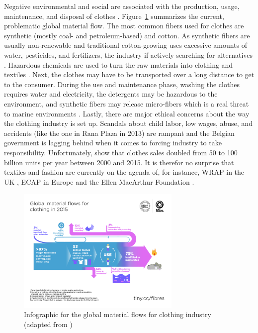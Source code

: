 \documentclass[review]{elsarticle}
\begin{document}
Negative environmental and social are associated with the production, usage, maintenance, and disposal of clothes \citep{Roos2016}. Figure~\ref{fig:MaterialFlow} summarizes the current, problematic global material flow. The most common fibers used for clothes are synthetic (mostly coal- and petroleum-based) and cotton. As synthetic fibers are usually non-renewable and traditional cotton-growing uses excessive amounts of water, pesticides, and fertilizers, the industry if actively searching for alternatives \citep{Meyer}. Hazardous chemicals are used to turn the raw materials into clothing and textiles \citep{VanDerVelden,Kant2012}. Next, the clothes may have to be transported over a long distance to get to the consumer. During the use and maintenance phase, washing the clothes requires water and electricity, the detergents may be hazardous to the environment, and synthetic fibers may release micro-fibers which is a real threat to marine environments \citep{Cesa2017,DeFalco2018, Thevenon}. Lastly, there are major ethical concerns about the way the clothing industry is set up. Scandals about child labor, low wages, abuse, and accidents (like the one in Rana Plaza in 2013) are rampant and the Belgian government is lagging behind when it comes to forcing industry to take responsibility\citep{Goethals2018}. Unfortunately, \cite{Morlet2017} show that clothes sales doubled from 50 to 100 billion units per year between 2000 and 2015. It is therefor no surprise that textiles and fashion are currently on the agenda of, for instance, WRAP in the UK \citep{WrapUK}, ECAP in Europe \citep{ECAP} and the Ellen MacArthur Foundation \citep{Morlet2017}. 
\begin{figure}[ht]
\begin{center}
 \includegraphics[width=0.7\textwidth]{figures/Figure-3_-Global-material-flows-for-clothing-in-2015.pdf}
 \caption{Infographic for the global material flows for clothing industry (adapted from \citep{Morlet2017}) }\label{fig:MaterialFlow}
 \end{center}
\end{figure}
\end{document}
